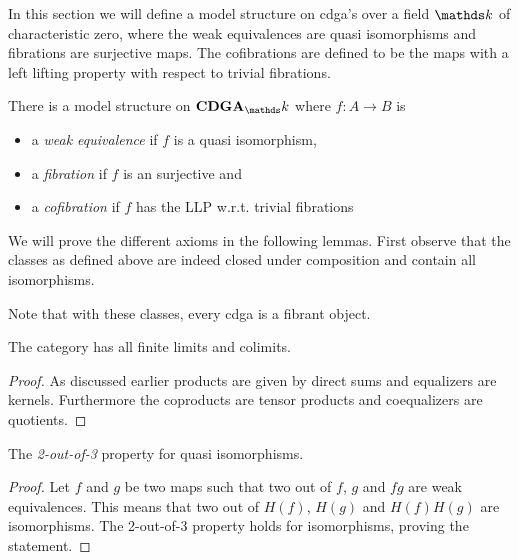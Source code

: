 
In this section we will define a model structure on cdga's over a field $\k$ of characteristic zero, where the weak equivalences are quasi isomorphisms and fibrations are surjective maps. The cofibrations are defined to be the maps with a left lifting property with respect to trivial fibrations.

\begin{proposition}
	There is a model structure on $\CDGA_\k$ where $f: A \to B$ is
	\begin{itemize}
		\item a \emph{weak equivalence} if $f$ is a quasi isomorphism,
		\item a \emph{fibration} if $f$ is an surjective and
		\item a \emph{cofibration} if $f$ has the LLP w.r.t. trivial fibrations
	\end{itemize}
\end{proposition}

We will prove the different axioms in the following lemmas. First observe that the classes as defined above are indeed closed under composition and contain all isomorphisms.

Note that with these classes, every cdga is a fibrant object.

\begin{lemma}
	[MC1] The category has all finite limits and colimits.
\end{lemma}
\begin{proof}
	As discussed earlier products are given by direct sums and equalizers are kernels. Furthermore the coproducts are tensor products and coequalizers are quotients.
\end{proof}

\begin{lemma}
	[MC2] The \emph{2-out-of-3} property for quasi isomorphisms.
\end{lemma}
\begin{proof}
	Let $f$ and $g$ be two maps such that two out of $f$, $g$ and $fg$ are weak equivalences. This means that two out of $H(f)$, $H(g)$ and $H(f)H(g)$ are isomorphisms. The 2-out-of-3 property holds for isomorphisms, proving the statement.
\end{proof}

